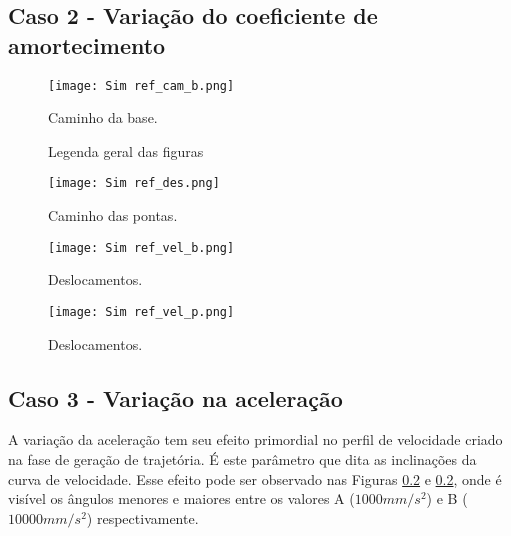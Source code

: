 \subsection{Caso 2 - Variação do coeficiente de amortecimento}
\begin{figure}[H]
    \centering
    \caption{Caminho da base.}
    \texttt{[image: Sim ref\_cam\_b.png]}

    \label{fig:ref_cam_b}
\end{figure}

\begin{figure}[H]
    \centering
    \hfill
    \caption{Legenda geral das figuras}
    \label{fig:ref_cam_p_s}
\end{figure}

\begin{figure}[H]
    \centering
    \caption{Caminho das pontas.}
    \texttt{[image: Sim ref\_des.png]}

    \label{fig:ref_des}
\end{figure}

\begin{figure}[H]
    \centering
    \caption{Deslocamentos.}
    \texttt{[image: Sim ref\_vel\_b.png]}

    \label{fig:ref_vel_b}
\end{figure}

\begin{figure}[H]
    \centering
    \caption{Deslocamentos.}
    \texttt{[image: Sim ref\_vel\_p.png]}

    \label{fig:ref_vel_p}
\end{figure}
\subsection{Caso 3 - Variação na aceleração}
A variação da aceleração tem seu efeito primordial no perfil de velocidade criado na fase de geração de trajetória. É este parâmetro que dita as inclinações da curva de velocidade. Esse efeito pode ser observado nas Figuras \ref{} e \ref{}, onde é visível os ângulos menores e maiores entre os valores A (\(1000 mm/s^2\)) e B (\(10000 mm/s^2\)) respectivamente.

